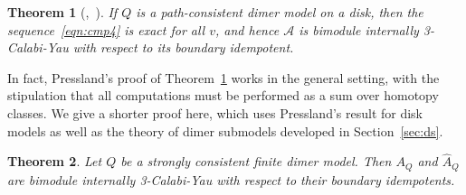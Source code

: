 \documentclass{article}
\newtheorem{thm}{Theorem}[section]
\theoremstyle{definition}
\newcommand{\A}{{\mathcal A}}
\begin{document}
\begin{thm}[{\cite[Theorem 3.7]{XPressland2019},~\cite[Theorem 5.6]{XPressland2015}}]\label{thm:Calabi-Yau-disk}
	If $Q$ is a path-consistent dimer model on a disk, then the sequence~\eqref{eqn:cmp4} is exact for all $v$, and hence $\A$ is bimodule internally 3-Calabi-Yau with respect to its boundary idempotent.
\end{thm}
In fact, Pressland's proof of Theorem~\ref{thm:Calabi-Yau-disk} works in the general setting, with the stipulation that all computations must be performed as a sum over homotopy classes. We give a shorter proof here, which uses Pressland's result for disk models as well as the theory of dimer submodels developed in Section~\ref{sec:ds}. 
\begin{thm}\label{thm:Calabi-Yau}
	Let $Q$ be a strongly consistent finite dimer model. Then $A_Q$ and $\widehat A_Q$ are bimodule internally 3-Calabi-Yau with respect to their boundary idempotents.
\end{thm}
\end{document}
